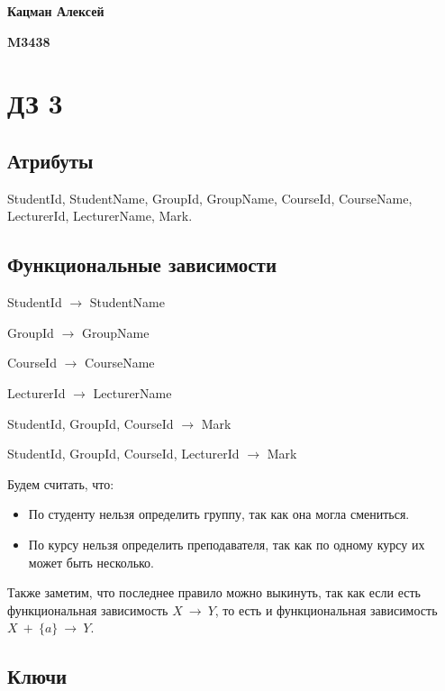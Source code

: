 \documentclass[12pt,a4paper,oneside]{article}
\begin{document}
\hfill \textbf{Кацман Алексей}

\hfill \textbf{M3438}

\bigskip

\section{ДЗ 3}
\subsection{Атрибуты}

\medskip

StudentId, StudentName, GroupId, GroupName, CourseId, CourseName, LecturerId, LecturerName, Mark.

\subsection{Функциональные зависимости}

\medskip

StudentId $\rightarrow$ StudentName

\noindent GroupId $\rightarrow$ GroupName

\noindent CourseId $\rightarrow$ CourseName

\noindent LecturerId $\rightarrow$ LecturerName

\noindent StudentId, GroupId, CourseId $\rightarrow$ Mark

\noindent StudentId, GroupId, CourseId, LecturerId $\rightarrow$ Mark

\medskip

Будем считать, что:

\begin{itemize}

\item По студенту нельзя определить группу, так как она могла смениться.

\item По курсу нельзя определить преподавателя, так как по одному курсу их может быть несколько.

\end{itemize}

\medskip

Также заметим, что последнее правило можно выкинуть, так как если есть функциональная зависимость $X\ \rightarrow\  Y$, то есть и функциональная зависимость $X\ +\ \{a\}\ \rightarrow\ Y$.

\subsection{Ключи}
\end{document}
